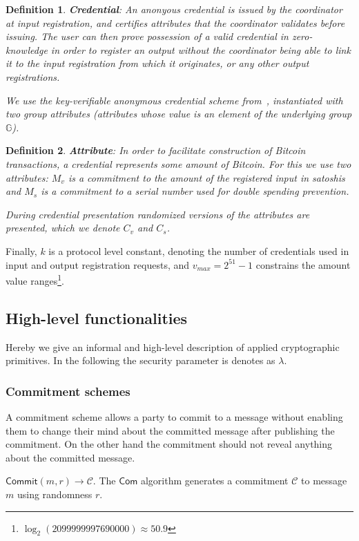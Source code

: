 \documentclass{article}
\newtheorem{definition}{Definition}[section]
\begin{document}
\begin{definition} \textbf{Credential}:
An anonyous credential is issued by the coordinator at input registration, and certifies attributes that the coordinator validates before issuing. The user can then prove possession of a valid credential in zero-knowledge in order to register an output without the coordinator being able to link it to the input registration from which it originates, or any other output registrations.

We use the key-verifiable anonymous credential scheme from~\cite{chase2019signal}, instantiated with two group attributes (attributes whose value is an element of the underlying group $\mathbb{G}$).
\end{definition}

\begin{definition}\textbf{Attribute}:
In order to facilitate construction of Bitcoin transactions, a credential represents some amount of Bitcoin. For this we use two attributes: $M_v$ is a commitment to the amount of the registered input in satoshis and $M_s$ is a commitment to a serial number used for double spending prevention.

During credential presentation randomized versions of the attributes are presented, which we denote $C_v$ and $C_s$.
\end{definition}

Finally, $k$ is a protocol level constant, denoting the number of credentials used in input and output registration requests, and $v_{\mathit{max}} = 2^{51}-1$ constrains the amount value ranges\footnote{$\log_2(2099999997690000) \approx 50.9$}.

\subsection{High-level functionalities}
Hereby we give an informal and high-level description of applied cryptographic primitives. In the following the security parameter is denotes as $\lambda$. 
\subsubsection{Commitment schemes}
A commitment scheme allows a party to commit to a message without enabling them to change their mind about the committed message after publishing the commitment. On the other hand the commitment should not reveal anything about the committed message.

\noindent$\mathsf{Commit}(m,r)\xrightarrow{}\mathcal{C}$. The $\mathsf{Com}$ algorithm generates a commitment $\mathcal{C}$ to message $m$ using randomness $r$.
\end{document}
